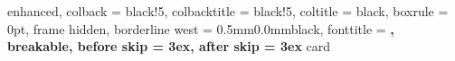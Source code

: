 \usepackage{titlesec}
\usepackage[many]{tcolorbox}

\titlespacing*{\chapter}{0cm}{-2.0cm}{0.50cm}
\titlespacing*{\section}{0cm}{0.50cm}{0.25cm}

\setlength{\parindent}{0pt}
\setlength{\parskip}{1ex}

\let\OldSection\section
\renewcommand{\section}{\clearpage\OldSection}


%
    {enhanced,
    colback = black!5, %
    colbacktitle = black!5,
    coltitle = black,
    boxrule = 0pt,
    frame hidden,
    borderline west = {0.5mm}{0.0mm}{black},
    fonttitle = \bfseries\sffamily,
    breakable,
    before skip = 3ex,
    after skip = 3ex
}{card}

